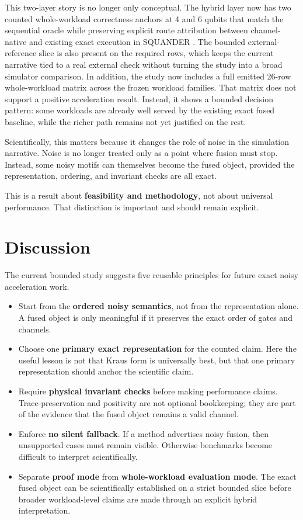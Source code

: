 This two-layer story is no longer only conceptual. The hybrid layer now has two
counted whole-workload correctness anchors at 4 and 6 qubits that match the
sequential oracle while preserving explicit route attribution between
channel-native and existing exact execution in SQUANDER \cite{r1}. The bounded
external-reference slice is also present on the required rows, which keeps the
current narrative tied to a real external check without turning the study into
a broad simulator comparison. In addition, the study now includes a full
emitted 26-row whole-workload matrix across the frozen workload families. That
matrix does not support a positive acceleration result. Instead, it shows a
bounded decision pattern: some workloads are already well served by the
existing exact fused baseline, while the richer path remains not yet justified
on the rest.

Scientifically, this matters because it changes the role of noise in the
simulation narrative. Noise is no longer treated only as a point where fusion
must stop. Instead, some noisy motifs can themselves become the fused object,
provided the representation, ordering, and invariant checks are all exact.

This is a result about \textbf{feasibility and methodology}, not about universal
performance. That distinction is important and should remain explicit.

\section{Discussion}

The current bounded study suggests five reusable principles for future exact
noisy acceleration work.

\begin{itemize}
  \item Start from the \textbf{ordered noisy semantics}, not from the representation alone.
        A fused object is only meaningful if it preserves the exact order of gates and
        channels.
  \item Choose one \textbf{primary exact representation} for the counted claim. Here the
        useful lesson is not that Kraus form is universally best, but that one primary
        representation should anchor the scientific claim.
  \item Require \textbf{physical invariant checks} before making performance claims.
        Trace-preservation and positivity are not optional bookkeeping; they are part
        of the evidence that the fused object remains a valid channel.
  \item Enforce \textbf{no silent fallback}. If a method advertises noisy fusion, then
        unsupported cases must remain visible. Otherwise benchmarks become difficult
        to interpret scientifically.
  \item Separate \textbf{proof mode} from \textbf{whole-workload evaluation mode}. The exact
        fused object can be scientifically established on a strict bounded slice
        before broader workload-level claims are made through an explicit hybrid
        interpretation.
\end{itemize}

